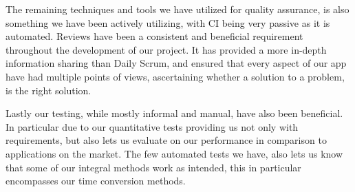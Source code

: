 The remaining techniques and tools we have utilized for quality assurance, is also something we have been actively utilizing, with \ac{CI} being very passive as it is automated.
Reviews have been a consistent and beneficial requirement throughout the development of our project.
It has provided a more in-depth information sharing than Daily Scrum, and ensured that every aspect of our app have had multiple points of views, ascertaining whether a solution to a problem, is the right solution.

Lastly our testing, while mostly informal and manual, have also been beneficial.
In particular due to our quantitative tests providing us not only with requirements, but also lets us evaluate on our performance in comparison to applications on the market.
The few automated tests we have, also lets us know that some of our integral methods work as intended, this in particular encompasses our time conversion methods.




